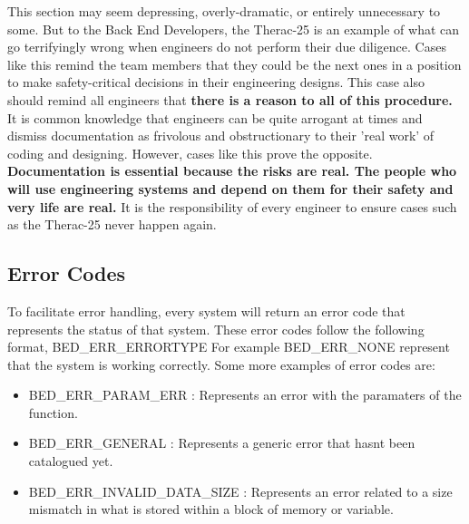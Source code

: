 \documentclass{article}
\begin{document}
This section may seem depressing, overly-dramatic, or entirely unnecessary to some. But to the Back End Developers, the Therac-25 is an example of what can go terrifyingly wrong when engineers do not perform their due diligence. Cases like this remind the team members that they could be the next ones in a position to make safety-critical decisions in their engineering designs. This case also should remind all engineers that \textbf{there is a reason to all of this procedure.} It is common knowledge that engineers can be quite arrogant at times and dismiss documentation as frivolous and obstructionary to their 'real work' of coding and designing. However, cases like this prove the opposite. \textbf{Documentation is essential because the risks are real. The people who will use engineering systems and depend on them for their safety and very life are real.} It is the responsibility of every engineer to ensure cases such as the Therac-25 never happen again.\\

\nocite{*}



\subsection*{Error Codes}
To facilitate error handling, every system will return an error code that represents the status of that system. These error codes follow the following format, BED\_ERR\_ERRORTYPE
For example BED\_ERR\_NONE represent that the system is working correctly. Some more examples of error codes are:
\begin{itemize}
	\item BED\_ERR\_PARAM\_ERR		 	: Represents an error with the paramaters of the function.
	\item BED\_ERR\_GENERAL			 	: Represents a generic error that hasnt been catalogued yet.
	\item BED\_ERR\_INVALID\_DATA\_SIZE	: Represents an error related to a size mismatch in what is stored within a block of memory or variable.
\end{itemize}
































\end{document}
